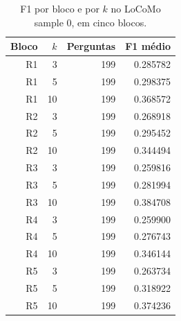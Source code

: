 \begin{table}[htbp]
\centering
\caption{F1 por bloco e por $k$ no LoCoMo sample 0, em cinco blocos.}
\label{tab:entrega3-f1-blocos}
\begin{tabular}{rrrr}
\hline
Bloco & $k$ & Perguntas & F1 médio \\
\hline
R1 & 3 & 199 & 0.285782 \\
R1 & 5 & 199 & 0.298375 \\
R1 & 10 & 199 & 0.368572 \\
R2 & 3 & 199 & 0.268918 \\
R2 & 5 & 199 & 0.295452 \\
R2 & 10 & 199 & 0.344494 \\
R3 & 3 & 199 & 0.259816 \\
R3 & 5 & 199 & 0.281994 \\
R3 & 10 & 199 & 0.384708 \\
R4 & 3 & 199 & 0.259900 \\
R4 & 5 & 199 & 0.276743 \\
R4 & 10 & 199 & 0.346144 \\
R5 & 3 & 199 & 0.263734 \\
R5 & 5 & 199 & 0.318922 \\
R5 & 10 & 199 & 0.374236 \\
\hline
\end{tabular}
\end{table}

